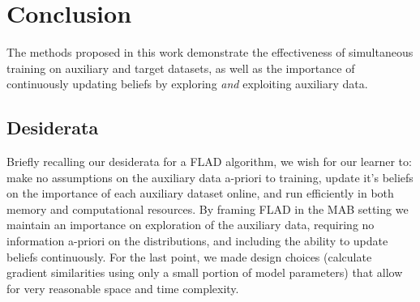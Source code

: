 \section{Conclusion}
The methods proposed in this work demonstrate the effectiveness of simultaneous training on auxiliary and target datasets, as well as the importance of continuously updating beliefs by exploring \textit{and} exploiting auxiliary data.

\subsection{Desiderata}
Briefly recalling our desiderata for a FLAD algorithm, we wish for our learner to: make no assumptions on the auxiliary data a-priori to training, update it's beliefs on the importance of each auxiliary dataset online, and run efficiently in both memory and computational resources. By framing FLAD in the MAB setting we maintain an importance on exploration of the auxiliary data, requiring no information a-priori on the distributions, and including the ability to update beliefs continuously. For the last point, we made design choices (calculate gradient similarities using only a small portion of model parameters) that allow for very reasonable space and time complexity.
